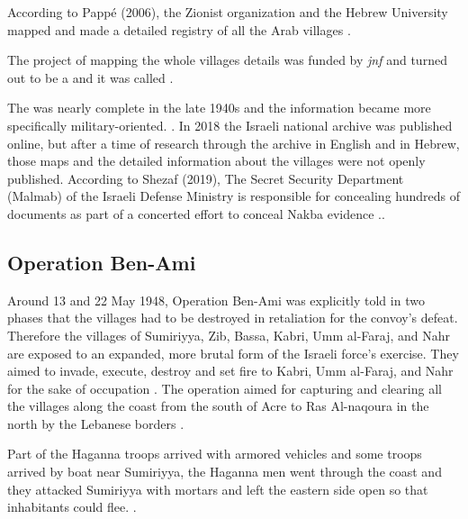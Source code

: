 According to Pappé (2006), the Zionist organization and the Hebrew University mapped and made a detailed registry of all the Arab villages \citep{Pappe2006}.



The project of mapping the whole villages details was funded by \textit{\acrfull{jnf}} and turned out to be a  and it was called \citep{Pappe2006}. 


The  was nearly complete in the late 1940s and the information became more specifically military-oriented. \citep{Pappe2006}. In 2018 the Israeli national archive was published online, but after a time of research through the archive in English and in Hebrew, those maps and the detailed information about the villages were not openly published. According to Shezaf (2019), The Secret Security Department (Malmab) of the Israeli Defense Ministry is responsible for concealing hundreds of documents as part of a concerted effort to conceal Nakba evidence \citep{Shezaf2019}.\citep{Shezaf2019}.


\subsection{Operation Ben-Ami}

Around 13 and 22 May 1948, Operation Ben-Ami was explicitly told in two phases that the villages had to be destroyed in retaliation for the convoy's defeat. Therefore the villages of Sumiriyya, Zib, Bassa, Kabri, Umm al-Faraj, and Nahr are exposed to an expanded, more brutal form of the Israeli force's  exercise. They aimed to invade, execute, destroy and set fire to Kabri, Umm al-Faraj, and Nahr for the sake of occupation \citep{Pappe2006}. The operation aimed for capturing and clearing all the villages along the coast from the south of Acre to Ras Al-naqoura in the north by the Lebanese borders \citep{Morris2004, Morris2008}.

Part of the Haganna troops arrived with armored vehicles and some troops arrived by boat near Sumiriyya, the Haganna men went through the coast and they attacked Sumiriyya with mortars and left the eastern side open so that inhabitants could flee. \citep{Morris2004, Morris2008}.

